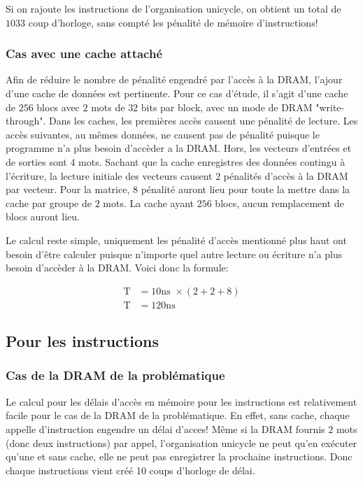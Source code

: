 \documentclass[a11paper]{article}
\begin{document}
Si on rajoute les instructions de l'organisation unicycle, on obtient un
total de $1033$ coup d'horloge, sans compté les pénalité de mémoire
d'instructions!

\subsubsection{Cas avec une cache attaché}

Afin de réduire le nombre de pénalité engendré par l'accès à la DRAM, l'ajour
d'une cache de données est pertinente. Pour ce cas d'étude, il s'agit d'une
cache de $256$ blocs avec $2$ mots de $32$ bits par block, avec un mode de
DRAM "write-through". Dans les caches, les premières accès causent une
pénalité de lecture. Les accès suivantes, au mêmes données, ne causent pas de
pénalité puisque le programme n'a plus besoin d'accèder a la DRAM. Hors, les
vecteurs d'entrées et de sorties sont $4$ mots. Sachant que la cache
enregistres des données contingu à l'écriture, la lecture initiale des
vecteurs causent $2$ pénalités d'accès à la DRAM par vecteur. Pour la
matrice, $8$ pénalité auront lieu pour toute la mettre dans la cache par
groupe de $2$ mots. La cache ayant $256$ blocs, aucun remplacement de blocs
auront lieu.

Le calcul reste simple, uniquement les pénalité d'accès mentionné plus haut
ont besoin d'être calculer puisque n'importe quel autre lecture ou écriture
n'a plus besoin d'accèder à la DRAM. Voici donc la formule:

\begin{align}
  \text{T} &= 10\text{ns }\times(2+2+8) \\
  \text{T} &= 120\text{ns}
\end{align}


\subsection{Pour les instructions}
\subsubsection{Cas de la DRAM de la problématique}

Le calcul pour les délais d'accès en mémoire pour les instructions est
relativement facile pour le cas de la DRAM de la problématique. En effet,
sans cache, chaque appelle d'instruction engendre un délai d'acces! Même si
la DRAM fournis $2$ mots (donc deux instructions) par appel, l'organisation
unicycle ne peut qu'en exécuter qu'une et sans cache, elle ne peut pas
enregistrer la prochaine instructions. Donc chaque instructions vient créé 10
coups d'horloge de délai.
\end{document}
